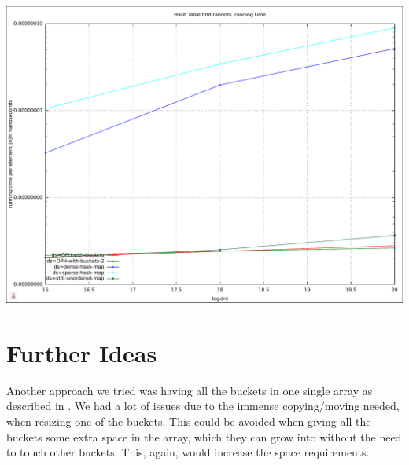 \documentclass{article}
\begin{document}
\includegraphics[width=\linewidth]{img/hash_find-random_time}

\section{Further Ideas}

Another approach we tried was having all the buckets in one single array as
described in \cite[p. 94]{mesa08}. We had a lot of issues due to the immense
copying/moving needed, when resizing one of the buckets. This could be avoided
when giving all the buckets some extra space in the array, which they can grow
into without the need to touch other buckets. This, again, would increase the
space requirements.

\printbibliography
\end{document}
